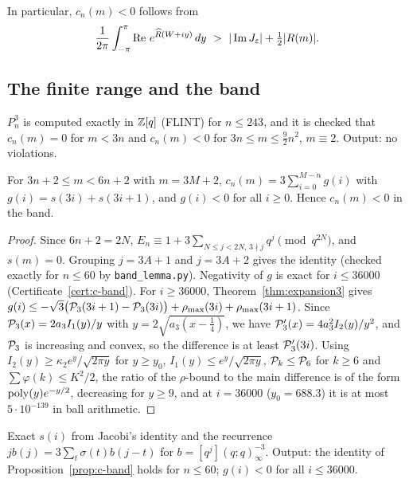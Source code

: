 In particular, $c_n(m)<0$ follows from
\begin{equation}\label{eq:c-target}
\frac1{2\pi}\int_{-\pi}^{\pi}\operatorname{Re}\,e^{\widehat R(W+iy)}\,dy\ >\ |\operatorname{Im} J_\varepsilon|+\tfrac12|R(m)| .
\end{equation}

\subsection{The finite range and the band}\label{sec:c-finite}

\begin{certificate}\label{cert:c-finite}
$P_n^3$ is computed exactly in $\mathbb Z[q]$ (FLINT) for $n\le243$, and it is checked that $c_n(m)=0$ for $m<3n$ and $c_n(m)<0$
for $3n\le m\le\frac92n^2$, $m\equiv2$. Output: no violations.
\end{certificate}

\begin{proposition}[band]\label{prop:c-band}
For $3n+2\le m<6n+2$ with $m=3M+2$, $c_n(m)=3\sum_{i=0}^{M-n}g(i)$ with $g(i)=s(3i)+s(3i+1)$, and $g(i)<0$ for all
$i\ge0$. Hence $c_n(m)<0$ in the band.
\end{proposition}
\begin{proof}
Since $6n+2=2N$, $E_n\equiv1+3\sum_{N\le j<2N,\,3\nmid j}q^j\pmod{q^{2N}}$, and $s(m)=0$. Grouping $j=3A+1$ and $j=3A+2$
gives the identity (checked exactly for $n\le60$ by \texttt{band\_lemma.py}). Negativity of $g$ is exact for $i\le36000$
(Certificate~\ref{cert:c-band}). For $i\ge36000$, Theorem~\ref{thm:expansion3} gives
$g(i)\le-\sqrt3\big(\mathcal P_3(3i+1)-\mathcal P_3(3i)\big)+\rho_{\max}(3i)+\rho_{\max}(3i+1)$. Since $\mathcal P_3(x)=2a_3I_1(y)/y$ with
$y=2\sqrt{a_3(x-\frac14)}$, we have $\mathcal P_3'(x)=4a_3^2I_2(y)/y^2$, and $\mathcal P_3$ is increasing and convex, so the difference
is at least $\mathcal P_3'(3i)$. Using $I_2(y)\ge\kappa_2e^y/\sqrt{2\pi y}$ for $y\ge y_0$, $I_1(y)\le e^y/\sqrt{2\pi y}$,
$\mathcal P_k\le\mathcal P_6$ for $k\ge6$ and $\sum\varphi(k)\le K^2/2$, the ratio of the $\rho$-bound to the main difference is of the
form ${\rm poly}(y)e^{-y/2}$, decreasing for $y\ge9$, and at $i=36000$ ($y_0=688.3$) it is at most $5\cdot10^{-139}$ in
ball arithmetic.
\end{proof}

\begin{certificate}\label{cert:c-band}
Exact $s(i)$ from Jacobi's identity and the recurrence $jb(j)=3\sum_t\sigma(t)b(j-t)$ for $b=[q^j](q;q)^{-3}_\infty$.
Output: the identity of Proposition~\ref{prop:c-band} holds for $n\le60$; $g(i)<0$ for all $i\le36000$.
\end{certificate}

